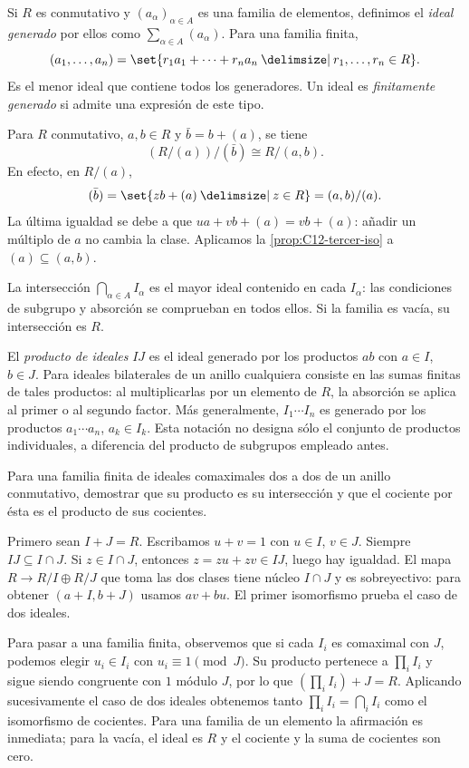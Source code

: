 Si $R$ es conmutativo y $(a_\alpha)_{\alpha\in A}$ es una familia de elementos, definimos el \emph{ideal generado} por ellos como $\sum_{\alpha\in A}(a_\alpha)$. Para una familia finita,
\[
(a_1,\ldots,a_n)
=\set{r_1a_1+\cdots+r_na_n\given r_1,\ldots,r_n\in R}.
\]
Es el menor ideal que contiene todos los generadores. Un ideal es \emph{finitamente generado} si admite una expresión de este tipo.

\begin{ejem}
Para $R$ conmutativo, $a,b\in R$ y $\bar b=b+(a)$, se tiene
\[
(R/(a))/(\bar b)\cong R/(a,b).
\]
En efecto, en $R/(a)$,
\[
(\bar b)=\set{zb+(a)\given z\in R}=(a,b)/(a).
\]
La última igualdad se debe a que $ua+vb+(a)=vb+(a)$: añadir un múltiplo de $a$ no cambia la clase. Aplicamos la \cref{prop:C12-tercer-iso} a $(a)\subseteq(a,b)$.
\end{ejem}

La intersección $\bigcap_{\alpha\in A}I_\alpha$ es el mayor ideal contenido en cada $I_\alpha$: las condiciones de subgrupo y absorción se comprueban en todos ellos. Si la familia es vacía, su intersección es $R$.

El \emph{producto de ideales} $IJ$ es el ideal generado por los productos $ab$ con $a\in I$, $b\in J$. Para ideales bilaterales de un anillo cualquiera consiste en las sumas finitas de tales productos: al multiplicarlas por un elemento de $R$, la absorción se aplica al primer o al segundo factor. Más generalmente, $I_1\cdots I_n$ es generado por los productos $a_1\cdots a_n$, $a_k\in I_k$. Esta notación no designa sólo el conjunto de productos individuales, a diferencia del producto de subgrupos empleado antes.

\begin{ejer}\label{ejer:C21-chino}
Para una familia finita de ideales comaximales dos a dos de un anillo conmutativo, demostrar que su producto es su intersección y que el cociente por ésta es el producto de sus cocientes.
\end{ejer}
\begin{sol}
Primero sean $I+J=R$. Escribamos $u+v=1$ con $u\in I$, $v\in J$. Siempre $IJ\subseteq I\cap J$. Si $z\in I\cap J$, entonces $z=zu+zv\in IJ$, luego hay igualdad. El mapa $R\to R/I\oplus R/J$ que toma las dos clases tiene núcleo $I\cap J$ y es sobreyectivo: para obtener $(a+I,b+J)$ usamos $av+bu$. El primer isomorfismo prueba el caso de dos ideales.

Para pasar a una familia finita, observemos que si cada $I_i$ es comaximal con $J$, podemos elegir $u_i\in I_i$ con $u_i\equiv1\pmod J$. Su producto pertenece a $\prod_iI_i$ y sigue siendo congruente con $1$ módulo $J$, por lo que $(\prod_iI_i)+J=R$. Aplicando sucesivamente el caso de dos ideales obtenemos tanto $\prod_iI_i=\bigcap_iI_i$ como el isomorfismo de cocientes. Para una familia de un elemento la afirmación es inmediata; para la vacía, el ideal es $R$ y el cociente y la suma de cocientes son cero.
\end{sol}

